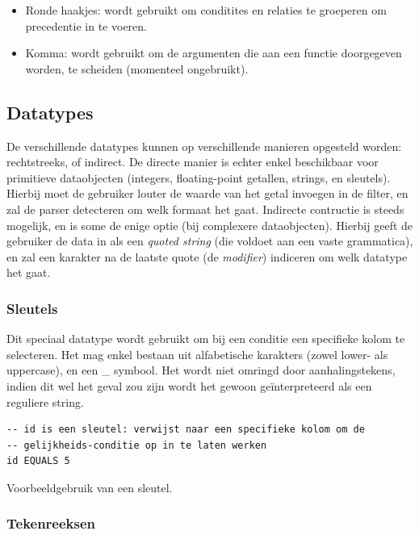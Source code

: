 \begin{itemize}
\item{Ronde haakjes: wordt gebruikt om conditites en relaties te groeperen om precedentie in te voeren.}
\item{Komma: wordt gebruikt om de argumenten die aan een functie doorgegeven worden, te scheiden (momenteel ongebruikt).}
\end{itemize}

\subsection{Datatypes}

De verschillende datatypes kunnen op verschillende manieren opgesteld worden: rechtstreeks, of indirect. De directe manier is echter enkel beschikbaar voor primitieve dataobjecten (integers, floating-point getallen, strings, en sleutels). Hierbij moet de gebruiker louter de waarde van het getal invoegen in de filter, en zal de parser detecteren om welk formaat het gaat.
Indirecte contructie is steeds mogelijk, en is some de enige optie (bij complexere dataobjecten). Hierbij geeft de gebruiker de data in als een \emph{quoted string} (die voldoet aan een vaste grammatica), en zal een karakter na de laatste quote (de \emph{modifier}) indiceren om welk datatype het gaat.

\subsubsection{Sleutels}

Dit speciaal datatype wordt gebruikt om bij een conditie een specifieke kolom te selecteren. Het mag enkel bestaan uit alfabetische karakters (zowel lower- als uppercase), en een \_ symbool. Het wordt niet omringd door aanhalingstekens, indien dit wel het geval zou zijn wordt het gewoon ge\"interpreteerd als een reguliere string.

\begin{code}
\begin{verbatim}
-- id is een sleutel: verwijst naar een specifieke kolom om de
-- gelijkheids-conditie op in te laten werken
id EQUALS 5
\end{verbatim}
\caption{Voorbeeldgebruik van een sleutel.}
\end{code}

\subsubsection{Tekenreeksen}

